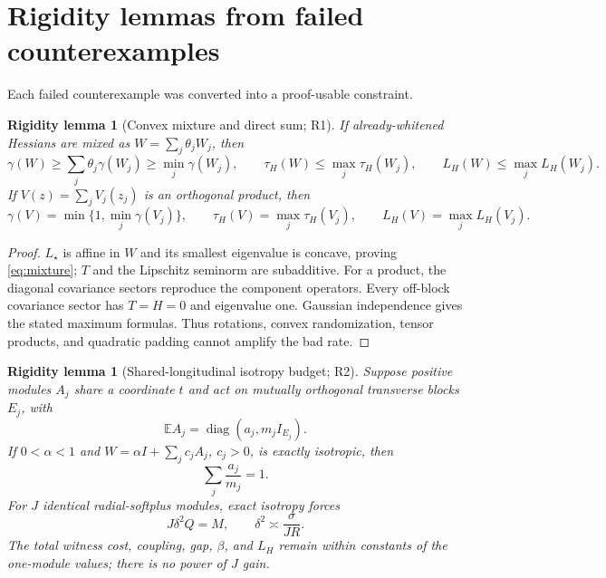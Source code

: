 \documentclass[11pt]{article}
\numberwithin{equation}{section}
\newtheorem{rigidity}[theorem]{Rigidity lemma}
\newcommand{\E}{\mathbb E}
\begin{document}
\section{Rigidity lemmas from failed counterexamples}\label{sec:rigidity}

Each failed counterexample was converted into a proof-usable constraint.

\begin{rigidity}[Convex mixture and direct sum; R1]
\label{rig:mixture}
If already-whitened Hessians are mixed as $W=\sum_j\theta_jW_j$, then
\begin{equation}\label{eq:mixture}
 \gamma(W)\ge\sum_j\theta_j\gamma(W_j)\ge\min_j\gamma(W_j),\qquad
 \tau_H(W)\le\max_j\tau_H(W_j),\qquad
 L_H(W)\le\max_jL_H(W_j).
\end{equation}
If $V(z)=\sum_jV_j(z_j)$ is an orthogonal product, then
\begin{equation}\label{eq:direct-sum}
 \gamma(V)=\min\{1,\min_j\gamma(V_j)\},\qquad
 \tau_H(V)=\max_j\tau_H(V_j),\qquad
 L_H(V)=\max_jL_H(V_j).
\end{equation}
\end{rigidity}

\begin{proof}
$L_\star$ is affine in $W$ and its smallest eigenvalue is concave, proving
\eqref{eq:mixture}; $T$ and the Lipschitz seminorm are subadditive.  For a
product, the diagonal covariance sectors reproduce the component operators.
Every off-block covariance sector has $T=H=0$ and eigenvalue one.  Gaussian
independence gives the stated maximum formulas.  Thus rotations, convex
randomization, tensor products, and quadratic padding cannot amplify the
bad rate.
\end{proof}

\begin{rigidity}[Shared-longitudinal isotropy budget; R2]
\label{rig:shared-t}
Suppose positive modules $A_j$ share a coordinate $t$ and act on mutually
orthogonal transverse blocks $E_j$, with
\[
 \E A_j=\operatorname{diag}(a_j,m_jI_{E_j}).
\]
If $0<\alpha<1$ and
$W=\alpha I+\sum_jc_jA_j$, $c_j>0$, is exactly isotropic, then
\begin{equation}\label{eq:isotropy-budget}
 \boxed{\sum_j\frac{a_j}{m_j}=1.}
\end{equation}
For $J$ identical radial-softplus modules, exact isotropy forces
\begin{equation}\label{eq:J-root}
 J\delta^2Q=M,\qquad \delta^2\asymp\frac{\sigma}{JR}.
\end{equation}
The total witness cost, coupling, gap, $\beta$, and $L_H$ remain within
constants of the one-module values; there is no power of $J$ gain.
\end{rigidity}
\end{document}

